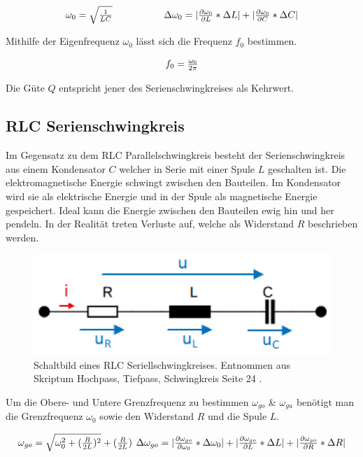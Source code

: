 \documentclass[12pt,a4paper,twoside]{article}
\begin{document}
\begin{equation}
    \label{eq:Eigenfrequenz}
    \centerline{$\omega_0 = \sqrt{\frac{1}{LC}}$ \\ $\Delta \omega_0 = \vert \frac{\partial \omega_0}{\partial L} * \Delta L \vert + \vert \frac{\partial \omega_0}{\partial C} * \Delta C \vert$}
\end{equation}

\noindent
Mithilfe der Eigenfrequenz $\omega_0$ lässt sich die Frequenz $f_0$ bestimmen. 

\begin{equation}
    \label{eq:Frequenz}
    \centerline{$f_0 = \frac{\omega_0}{2 \pi}$}
\end{equation}

\noindent
Die Güte $Q$ entspricht jener des Serienschwingkreises als Kehrwert. 

\subsection{RLC Serienschwingkreis}
Im Gegensatz zu dem RLC Parallelschwingkreis besteht der Serienschwingkreis aus einem Kondensator $C$ welcher in Serie mit einer Spule $L$ geschalten ist. 
Die elektromagnetische Energie schwingt zwischen den Bauteilen. Im Kondensator wird sie als elektrische Energie und in der Spule als magnetische Energie gespeichert. 
Ideal kann die Energie zwischen den Bauteilen ewig hin und her pendeln. 
In der Realität treten Verluste auf, welche als Widerstand $R$ beschrieben werden. 

\begin{figure}[H]
    \centering
    \includegraphics[width=0.6\linewidth]{nudes/RLCseriell.jpg}
    \caption{Schaltbild eines RLC Seriellschwingkreises. Entnommen aus Skriptum Hochpass, Tiefpass, Schwingkreis Seite 24 \cite{teachcenter2}. }
    \label{fig:grundSeriell}
\end{figure}

\noindent
Um die Obere- und Untere Grenzfrequenz zu bestimmen $\omega_{go}$ \& $\omega_{gu}$ benötigt man die Grenzfrequenz $\omega_0$ sowie den Widerstand $R$ und die Spule $L$. 

\begin{equation}
    \label{eq:wgo}
    \centerline{$\omega_{go} = \sqrt{\omega_0^2 + (\frac{R}{2L})^2} + (\frac{R}{2L})$ \\ $\Delta \omega_{go}= \vert \frac{\partial \omega_{go}}{\partial \omega_0} * \Delta \omega_0 \vert + \vert \frac{\partial \omega_{go}}{\partial L} * \Delta L \vert + \vert \frac{\partial \omega_{go}}{\partial R} * \Delta R \vert$}
\end{equation}
\end{document}
